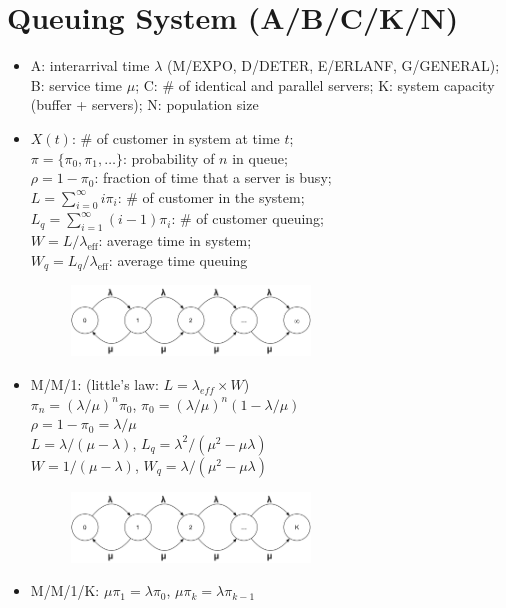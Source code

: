 \documentclass[10pt, twocolumn]{article}
\begin{document}
\section*{Queuing System (A/B/C/K/N)} \vspace*{-1em}
\begin{itemize}
\item A: interarrival time $\lambda$ (M/EXPO, D/DETER, E/ERLANF, G/GENERAL); B: service time $\mu$; C: \# of identical and parallel servers; K: system capacity (buffer + servers); N: population size
\item $X(t)$: \# of customer in system at time $t$; \\
$\pi=\{\pi_0,\pi_1,\dots\}$: probability of $n$ in queue; \\
$\rho=1-\pi_0$: fraction of time that a server is busy; \\
$L=\sum_{i=0}^{\infty}i\pi_i$: \# of customer in the system; \\
$L_q=\sum_{i=1}^{\infty}(i-1)\pi_i$: \# of customer queuing; \\
$W=L/\lambda_{\text{eff}}$: average time in system; \\
$W_q=L_q/\lambda_{\text{eff}}$: average time queuing
\begin{figure}[!h]
\centering
\includegraphics[width=2.5in]{MM1}
\end{figure}
\item M/M/1: (little's law: $L = \lambda_{eff} \times W$) \\
$\pi_n=(\lambda/\mu)^n\pi_0$, $\pi_0 = (\lambda/\mu)^n(1-\lambda/\mu)$ \\
$\rho=1-\pi_0=\lambda/\mu$ \\
$L=\lambda/(\mu-\lambda)$, $L_q=\lambda^2/(\mu^2-\mu\lambda)$ \\
$W=1/(\mu-\lambda)$, $W_q=\lambda/(\mu^2-\mu\lambda)$
\begin{figure}[!h]
\centering
\includegraphics[width=2.5in]{MM1K}
\end{figure}
\item M/M/1/K: $\mu\pi_1=\lambda\pi_0$, $\mu\pi_k=\lambda\pi_{k-1}$ \\

\end{itemize}
\end{document}
